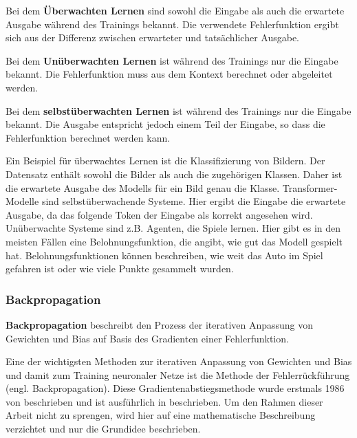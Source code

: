 \begin{definition}\label{def:ueberwachtes-lernen}
    Bei dem \textbf{Überwachten Lernen} sind sowohl die Eingabe als auch die erwartete Ausgabe während des Trainings bekannt.
    Die verwendete Fehlerfunktion ergibt sich aus der Differenz zwischen erwarteter und tatsächlicher Ausgabe.
\end{definition}

\begin{definition}\label{def:unueberwachtes-lernen}
    Bei dem \textbf{Unüberwachten Lernen} ist während des Trainings nur die Eingabe bekannt.
    Die Fehlerfunktion muss aus dem Kontext berechnet oder abgeleitet werden.
\end{definition}

\begin{definition}\label{def:selbstueberwachtes-lernen}
    Bei dem \textbf{selbstüberwachten Lernen} ist während des Trainings nur die Eingabe bekannt.
    Die Ausgabe entspricht jedoch einem Teil der Eingabe, so dass die Fehlerfunktion berechnet werden kann.
\end{definition}

Ein Beispiel für überwachtes Lernen ist die Klassifizierung von Bildern.
Der Datensatz enthält sowohl die Bilder als auch die zugehörigen Klassen.
Daher ist die erwartete Ausgabe des Modells für ein Bild genau die Klasse.
Transformer-Modelle sind selbstüberwachende Systeme.
Hier ergibt die Eingabe die erwartete Ausgabe, da das folgende Token der Eingabe als korrekt angesehen wird.
Unüberwachte Systeme sind z.B. Agenten, die Spiele lernen.
Hier gibt es in den meisten Fällen eine Belohnungsfunktion, die angibt, wie gut das Modell gespielt hat.
Belohnungsfunktionen können beschreiben, wie weit das Auto im Spiel gefahren ist oder wie viele Punkte gesammelt wurden.\\
\subsubsection{Backpropagation}
\begin{definition}\label{def:backpropagation}
    \textbf{Backpropagation} beschreibt den Prozess der iterativen Anpassung von Gewichten und Bias auf Basis des Gradienten einer Fehlerfunktion.
\end{definition}

Eine der wichtigsten Methoden zur iterativen Anpassung von Gewichten und Bias und damit zum Training neuronaler Netze ist die Methode der Fehlerrückführung (engl. Backpropagation).
Diese Gradientenabstiegsmethode wurde erstmals 1986 von \citet{backpropagation} beschrieben und ist ausführlich in \citet{neuronale-netze} beschrieben.
Um den Rahmen dieser Arbeit nicht zu sprengen, wird hier auf eine mathematische Beschreibung verzichtet und nur die Grundidee beschrieben.\\

